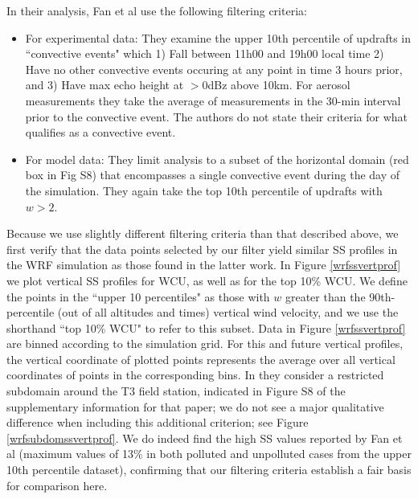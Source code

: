 \documentclass{article}
\begin{document}
In their analysis, Fan et al use the following filtering criteria:
\begin{itemize}
	\item For experimental data: They examine the upper 10th percentile of updrafts in ``convective events" which 1) Fall between 11h00 and 19h00 local time 2) Have no other convective events occuring at any point in time 3 hours prior, and 3) Have max echo height at $>$0dBz above 10km. For aerosol measurements they take the average of measurements in the 30-min interval prior to the convective event. The authors do not state their criteria for what qualifies as a convective event.
	\item For model data: They limit analysis to a subset of the horizontal domain (red box in Fig S8) that encompasses a single convective event during the day of the simulation. They again take the top 10th percentile of updrafts with $w>2$. 
\end{itemize}

Because we use slightly different filtering criteria than that described above, we first verify that the data points selected by our filter yield similar SS profiles in the WRF simulation as those found in the latter work. In Figure \ref{wrfssvertprof} we plot vertical SS profiles for WCU, as well as for the top 10\% WCU. We define the points in the ``upper 10 percentiles" as those with $w$ greater than the 90th-percentile (out of all altitudes and times) vertical wind velocity, and we use the shorthand ``top 10\% WCU" to refer to this subset. Data in Figure \ref{wrfssvertprof} are binned according to the simulation grid. For this and future vertical profiles, the vertical coordinate of plotted points represents the average over all vertical coordinates of points in the corresponding bins. In \cite{Fan2018} they consider a restricted subdomain around the T3 field station, indicated in Figure S8 of the supplementary information for that paper; we do not see a major qualitative difference when including this additional criterion; see Figure \ref{wrfsubdomssvertprof}. We do indeed find the high SS values reported by Fan et al (maximum values of 13\% in both polluted and unpolluted cases from the upper 10th percentile dataset), confirming that our filtering criteria establish a fair basis for comparison here.
\end{document}
